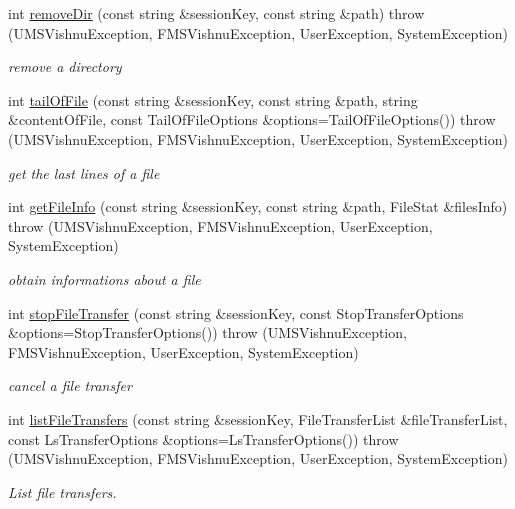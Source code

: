 \begin{DoxyCompactItemize}
int \hyperlink{namespacevishnu_a23105333be3ff847f7c274f6372364bc}{removeDir} (const string \&sessionKey, const string \&path)  throw (UMSVishnuException, FMSVishnuException, UserException, SystemException)
\begin{DoxyCompactList}\small\item\em remove a directory \item\end{DoxyCompactList}\item 
int \hyperlink{namespacevishnu_aa8c92237272b5c0e92360f617a2a4edc}{tailOfFile} (const string \&sessionKey, const string \&path, string \&contentOfFile, const TailOfFileOptions \&options=TailOfFileOptions())  throw (UMSVishnuException, FMSVishnuException, UserException, SystemException)
\begin{DoxyCompactList}\small\item\em get the last lines of a file \item\end{DoxyCompactList}\item 
int \hyperlink{namespacevishnu_a3da75d7c75b5d6a58112f62c5b3eeae0}{getFileInfo} (const string \&sessionKey, const string \&path, FileStat \&filesInfo)  throw (UMSVishnuException, FMSVishnuException, UserException, SystemException)
\begin{DoxyCompactList}\small\item\em obtain informations about a file \item\end{DoxyCompactList}\item 
int \hyperlink{namespacevishnu_ac7f9c1d4391157b7dddaab5051fd44a8}{stopFileTransfer} (const string \&sessionKey, const StopTransferOptions \&options=StopTransferOptions())  throw (UMSVishnuException, FMSVishnuException, UserException, SystemException)
\begin{DoxyCompactList}\small\item\em cancel a file transfer \item\end{DoxyCompactList}\item 
int \hyperlink{namespacevishnu_a5159cd0b198000c690a1e9f88abb1329}{listFileTransfers} (const string \&sessionKey, FileTransferList \&fileTransferList, const LsTransferOptions \&options=LsTransferOptions())  throw (UMSVishnuException, FMSVishnuException, UserException, SystemException)
\begin{DoxyCompactList}\small\item\em List file transfers. \item\end{DoxyCompactList}\end{DoxyCompactItemize}
